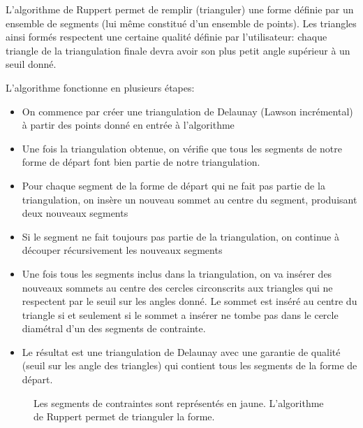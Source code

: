 L'algorithme de Ruppert permet de remplir (trianguler) une forme définie par un ensemble de segments (lui même constitué d'un ensemble de points). Les triangles ainsi formés respectent une certaine qualité définie par l'utilisateur: chaque triangle de la triangulation
finale devra avoir son plus petit angle supérieur à un seuil donné.

L'algorithme fonctionne en plusieurs étapes:
\begin {itemize}
	\item {On commence par créer une triangulation de Delaunay (Lawson incrémental) à partir des points donné en entrée à l'algorithme}
	\item {Une fois la triangulation obtenue, on vérifie que tous les segments de notre forme de départ font bien partie de notre triangulation.}
	\item {Pour chaque segment de la forme de départ qui ne fait pas partie de la triangulation, on insère un nouveau sommet au centre du segment, produisant deux nouveaux segments}
	\item {Si le segment ne fait toujours pas partie de la triangulation, on continue à découper récursivement les nouveaux segments}
	\item {Une fois tous les segments inclus dans la triangulation, on va insérer des nouveaux sommets au centre des cercles circonscrits aux triangles qui ne respectent par le seuil sur les angles donné. Le sommet est inséré au centre du triangle si et seulement si le sommet a insérer ne tombe pas dans le cercle diamétral d'un des segments de contrainte.}
	\item {Le résultat est une triangulation de Delaunay avec une garantie de qualité (seuil sur les angle des triangles) qui contient tous les segments de la forme de départ.}
\end {itemize}

\begin{figure}[h!]
	
	\caption{Les segments de contraintes sont représentés en jaune. L'algorithme de Ruppert permet de trianguler la forme.}
\end{figure}
\FloatBarrier
